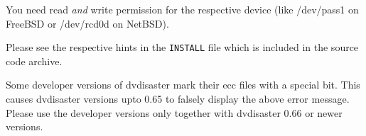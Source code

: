 { You need read {\em and} write permission for the respective device
  (like /dev/pass1 on FreeBSD or /dev/rcd0d on NetBSD). 

  Please see the respective hints in the {\tt INSTALL} file which is
  included in the source code archive.}

      {Some developer versions of dvdisaster mark their ecc files with a special bit.
        This causes dvdisaster versions upto 0.65 to falsely display the above error
        message. Please use the developer versions only together with dvdisaster
        0.66 or newer versions. }
